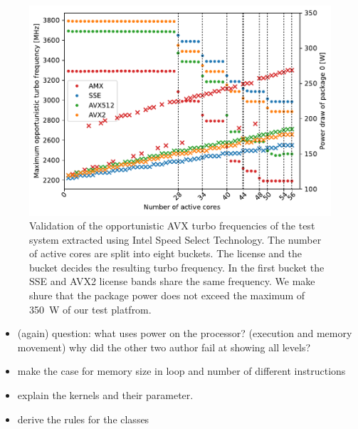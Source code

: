 \begin{figure}[]
    \centering
    \includegraphics[width=0.8\columnwidth]{fig/validate-avx-frequency-license-bands.pdf}
    \caption{\label{fig:validated-p0n-frequencies}Validation of the opportunistic AVX turbo frequencies of the test system extracted using Intel Speed Select Technology.
    The number of active cores are split into eight buckets. The license and the bucket decides the resulting turbo frequency.
    In the first bucket the SSE and AVX2 license bands share the same frequency. We make shure that the package power does not exceed the maximum of \SI{350}{\watt} of our test platfrom.}
\end{figure}





\begin{itemize}
    \item (again) question: what uses power on the processor? (execution and memory movement)
    why did the other two author fail at showing all levels?
    \item make the case for memory size in loop and number of different instructions
    \item explain the kernels and their parameter.
    \item derive the rules for the classes
\end{itemize}

